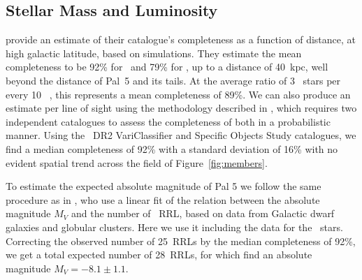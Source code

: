 \documentclass[twocolumn]{aastex63}
\begin{document}
\subsection{Stellar Mass and Luminosity}


\citet{Sesar2017b} provide an estimate of their catalogue's completeness as a function of distance, at high galactic latitude, based on simulations. They estimate the mean completeness to be 92\% for \rrab~and 79\% for \rrc, up to a distance of 40~kpc, well beyond the distance of Pal~5 and its tails. At the average ratio of 3 \rrc~stars per every 10 \rrab~\citep{Layden1995}, this represents a mean completeness of 89\%. We can also produce an estimate per line of sight using the methodology described in \citet{Rybizki2018}, which requires two independent catalogues to assess the completeness of both in a probabilistic manner. Using the \Gaia~DR2 VariClassifier \citet{Holl2018,Rimoldini2018} and Specific Objects Study \citep{Clementini2018} catalogues, we find a median completeness of 92\% with a standard deviation of 16\%  with no evident spatial trend across the field of Figure~\ref{fig:members}.


To estimate the expected absolute magnitude of Pal 5 we follow the same procedure as in \citet{Mateu2018}, who use a linear fit of the relation between the absolute magnitude $M_V$ and the number of \typeab\ RRL, based on data from Galactic dwarf galaxies and globular clusters. Here we use it including the data for the \typec~stars.
Correcting the observed number of 25~RRLs by the median completeness of 92\%, we get a total expected number of 28~RRLs, for which find an absolute magnitude $M_V=-8.1\pm 1.1$.

\end{document}
